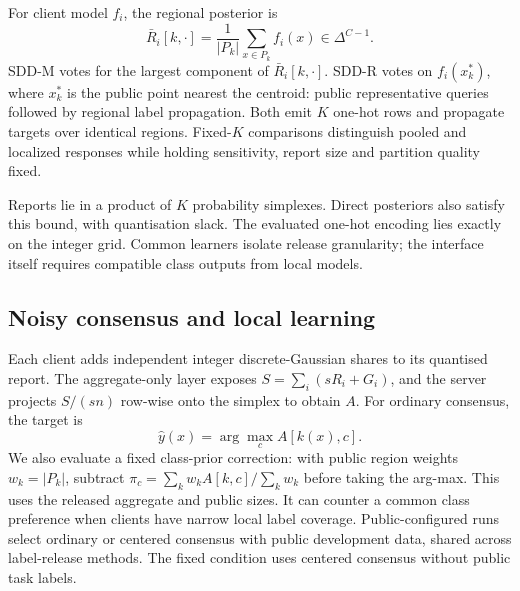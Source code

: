 For client model $f_i$, the regional posterior is
\begin{equation}
\bar R_i[k,\cdot]=\frac1{|P_k|}\sum_{x\in P_k}f_i(x)
\in\Delta^{C-1}.\label{eq:report}
\end{equation}
SDD-M votes for the largest component of $\bar R_i[k,\cdot]$.
SDD-R votes on $f_i(x_k^*)$, where $x_k^*$ is the public point nearest the
centroid: public representative queries followed by regional label propagation.
Both emit $K$ one-hot rows and propagate targets over identical
regions. Fixed-$K$ comparisons distinguish pooled and localized responses
while holding sensitivity, report size and partition quality fixed.

Reports lie in a product of $K$ probability simplexes. Direct posteriors also
satisfy this bound, with quantisation slack. The evaluated one-hot encoding
lies exactly on the integer grid. Common learners isolate release granularity;
the interface itself requires compatible class outputs from local models.

\subsection{Noisy consensus and local learning}
\label{sec:method:agg}

Each client adds independent integer discrete-Gaussian shares to its quantised
report. The aggregate-only layer exposes $S=\sum_i(sR_i+G_i)$, and the server
projects $S/(sn)$ row-wise onto the simplex to obtain $A$.
For ordinary consensus, the target is
\begin{equation}
\hat y(x)=\arg\max_c A[k(x),c].\label{eq:targets}
\end{equation}
We also evaluate a fixed class-prior correction: with public region weights
$w_k=|P_k|$, subtract
$\pi_c=\sum_k w_k A[k,c]/\sum_k w_k$ before taking the arg-max.
This uses the released aggregate and public sizes. It can counter a common
class preference when clients have narrow local label coverage.
Public-configured runs select ordinary or centered consensus with public
development data, shared across label-release methods. The fixed condition
uses centered consensus without public task labels.

